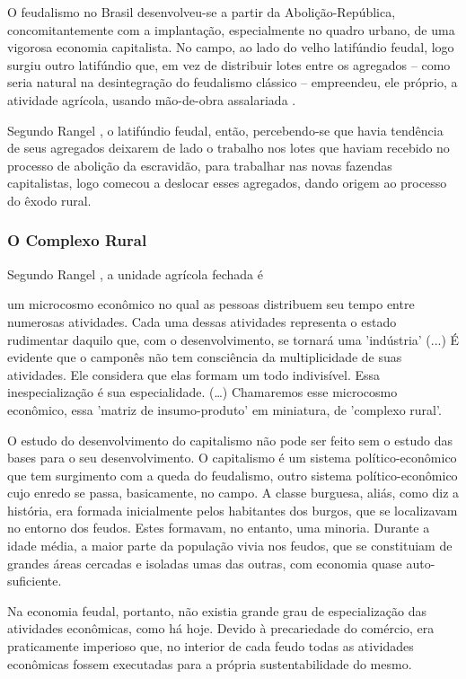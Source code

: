 \documentclass[
	12pt,				%
	oneside,			%
	a4paper,			%
	chapter=TITLE,		%
	section=TITLE,		%
	english,			%
	brazil				%
	]{abntex2}
\begin{document}
O feudalismo no Brasil desenvolveu-se a partir da Abolição-República,
concomitantemente com a implantação, especialmente no quadro urbano, de
uma vigorosa economia capitalista. No campo, ao lado do velho latifúndio
feudal, logo surgiu outro latifúndio que, em vez de distribuir lotes
entre os agregados -- como seria natural na desintegração do feudalismo
clássico -- empreendeu, ele próprio, a atividade agrícola, usando
mão-de-obra assalariada \autocite[ 738-739]{rangel1989}.

Segundo Rangel \autocite*[739]{rangel1989}, o latifúndio feudal, então,
percebendo-se que havia tendência de seus agregados deixarem de lado o
trabalho nos lotes que haviam recebido no processo de abolição da
escravidão, para trabalhar nas novas fazendas capitalistas, logo comecou
a deslocar esses agregados, dando origem ao processo do êxodo rural.

\subsubsection{O Complexo Rural}\label{o-complexo-rural}

Segundo Rangel \autocite*[p.98]{rangel1956}, a unidade agrícola fechada
é
\begin{citacao}
um microcosmo econômico no qual as pessoas distribuem seu tempo entre numerosas
atividades. Cada uma dessas atividades representa o estado rudimentar daquilo
que, com o desenvolvimento, se tornará uma 'indústria' (...) É evidente que o
camponês não tem consciência da multiplicidade de suas atividades. Ele considera
que elas formam um todo indivisível. Essa inespecialização é sua especialidade.
(\ldots) Chamaremos esse microcosmo econômico, essa 'matriz de insumo-produto' em
miniatura, de 'complexo rural'.
\end{citacao}
O estudo do desenvolvimento do capitalismo não pode ser feito sem o
estudo das bases para o seu desenvolvimento. O capitalismo é um sistema
político-econômico que tem surgimento com a queda do feudalismo, outro
sistema político-econômico cujo enredo se passa, basicamente, no campo.
A classe burguesa, aliás, como diz a história, era formada inicialmente
pelos habitantes dos burgos, que se localizavam no entorno dos feudos.
Estes formavam, no entanto, uma minoria. Durante a idade média, a maior
parte da população vivia nos feudos, que se constituiam de grandes áreas
cercadas e isoladas umas das outras, com economia quase auto-suficiente.

Na economia feudal, portanto, não existia grande grau de especialização
das atividades econômicas, como há hoje. Devido à precariedade do
comércio, era praticamente imperioso que, no interior de cada feudo
todas as atividades econômicas fossem executadas para a própria
sustentabilidade do mesmo.
\end{document}
